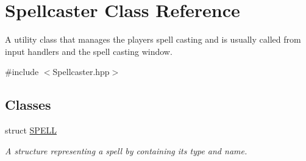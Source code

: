 \hypertarget{class_spellcaster}{}\section{Spellcaster Class Reference}
\label{class_spellcaster}


A utility class that manages the player\textquotesingle{}s spell casting and is usually called from input handlers and the spell casting window.  




{\ttfamily \#include $<$Spellcaster.\+hpp$>$}

\subsection*{Classes}
\begin{DoxyCompactItemize}
\item 
struct \hyperlink{struct_spellcaster_1_1_s_p_e_l_l}{S\+P\+E\+LL}
\begin{DoxyCompactList}\small\item\em A structure representing a spell by containing it\textquotesingle{}s type and name. \end{DoxyCompactList}\end{DoxyCompactItemize}
